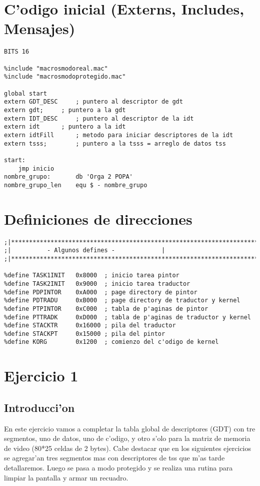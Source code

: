 \documentclass[11pt]{article}
\begin{document}
\newpage

\section{ C'odigo inicial (Externs, Includes, Mensajes) }
\begin{lstlisting}[frame=single]
BITS 16

%include "macrosmodoreal.mac"
%include "macrosmodoprotegido.mac"

global start
extern GDT_DESC		; puntero al descriptor de gdt
extern gdt;		; puntero a la gdt
extern IDT_DESC		; puntero al descriptor de la idt
extern idt		; puntero a la idt
extern idtFill		; metodo para iniciar descriptores de la idt
extern tsss;		; puntero a la tsss = arreglo de datos tss 

start:
	jmp	inicio	
nombre_grupo:		db 'Orga 2 POPA'
nombre_grupo_len	equ $ - nombre_grupo
\end{lstlisting}

\section{Definiciones de direcciones}
\begin{lstlisting}[frame=single]
;|**********************************************************************|
;|			- Algunos defines -				|
;|**********************************************************************|

%define TASK1INIT	0x8000	; inicio tarea pintor
%define TASK2INIT	0x9000	; inicio tarea traductor
%define PDPINTOR	0xA000	; page directory de pintor
%define PDTRADU		0xB000	; page directory de traductor y kernel
%define PTPINTOR	0xC000	; tabla de p'aginas de pintor
%define PTTRADK		0xD000	; tabla de p'aginas de traductor y kernel
%define STACKTR		0x16000	; pila del traductor
%define STACKPT		0x15000	; pila del pintor 
%define KORG		0x1200	; comienzo del c'odigo de kernel
\end{lstlisting}

\newpage

\section{Ejercicio 1}
\subsection{Introducci'on} En este ejercicio vamos a completar la tabla global de descriptores (GDT) con tre segmentos, uno de datos, uno de c'odigo, y otro s'olo para la matriz de memoria de video (80*25 celdas de 2 bytes). Cabe destacar que en los siguientes ejercicios se agregar'an tres segmentos mas con descriptores de tss que m'as tarde detallaremos. Luego se pasa a modo protegido y se realiza una rutina para limpiar la pantalla y armar un recuadro.
\end{document}
